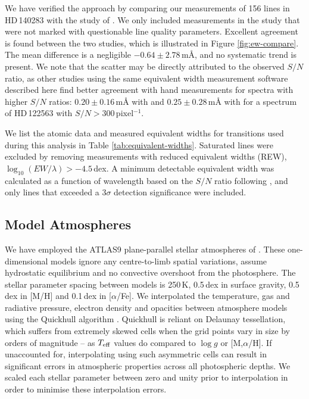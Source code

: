 \documentclass{emulateapj}
\begin{document}
We have verified the approach by comparing our measurements of 156 lines in HD\,140283 with the study of \citet{norris;et-al_1996}. We only included measurements in the \citet{norris;et-al_1996} study that were not marked with questionable line quality parameters. Excellent agreement is found between the two studies, which is illustrated in Figure \ref{fig:ew-compare}. The mean difference is a negligible ${-0.64 \pm 2.78}$\,m\AA{}, and no systematic trend is present. We note that the scatter may be directly attributed to the observed $S/N$ ratio, as other studies \citep{frebel;et-al_2013} using the same equivalent width measurement software described here find better agreement with hand measurements for spectra with higher $S/N$ ratios: $0.20 \pm 0.16$\,m{\AA} with \citet{aoki;et-al_2007} and $0.25 \pm 0.28$\,m{\AA} with \citet{cayrel;et-al_2004} for a spectrum of HD\,122563 with ${S/N > 300}$\,pixel$^{-1}$.

We list the atomic data and measured equivalent widths for transitions used during this analysis in Table \ref{tab:equivalent-widths}. Saturated lines were excluded by removing measurements with reduced equivalent widths (REW), ${\log_{10}{(EW/\lambda)} > -4.5}$\,dex. A minimum detectable equivalent width was calculated as a function of wavelength based on the $S/N$ ratio following \citet{norris;et-al_2001}, and only lines that exceeded a 3$\sigma$ detection significance were included. 

\subsection{Model Atmospheres}
We have employed the ATLAS9 plane-parallel stellar atmospheres of \citet{castelli;kurucz_2003}. These one-dimensional models ignore any centre-to-limb spatial variations, assume hydrostatic equilibrium and no convective overshoot from the photosphere. The stellar parameter spacing between models is 250\,K, 0.5\,dex in surface gravity, 0.5\,dex in [M/H] and 0.1\,dex in [$\alpha$/Fe]. We interpolated the temperature, gas and radiative pressure, electron density and opacities between atmosphere models using the Quickhull algorithm \citep{barber;et-al_1996}. Quickhull is reliant on Delaunay tessellation, which suffers from extremely skewed cells when the grid points vary in size by orders of magnitude -- as $T_{\rm eff}$ values do compared to $\log{g}$ or [M,$\alpha$/H]. If unaccounted for, interpolating using such asymmetric cells can result in significant errors in atmospheric properties across all photospheric depths. We scaled each stellar parameter between zero and unity prior to interpolation in order to minimise these interpolation errors. \\
\end{document}
